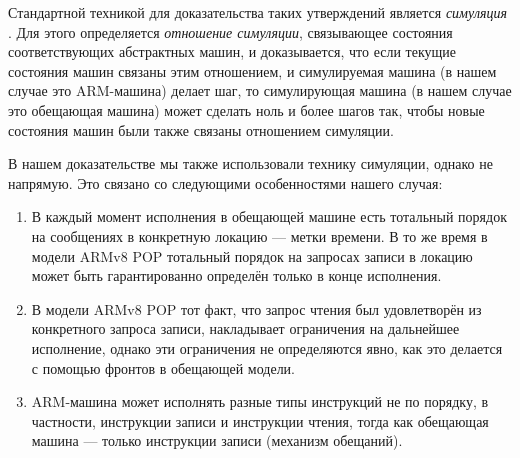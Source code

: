 Стандартной техникой для доказательства таких утверждений является
\emph{симуляция} \cite{Milner:Book89, Lynch-Vaandrager:IC95, Lynch-Vaandrager:IC96}.
Для этого определяется \emph{отношение симуляции}, связывающее состояния соответствующих
абстрактных машин, и доказывается, что если текущие состояния машин
связаны этим отношением, и симулируемая машина (в нашем случае это ARM-машина)
делает шаг, то симулирующая машина (в нашем случае это обещающая машина) может сделать ноль
и более шагов так, чтобы новые состояния машин были также связаны отношением симуляции.

В нашем доказательстве мы также использовали технику симуляции, однако не напрямую.
Это связано со следующими особенностями нашего случая:
\begin{enumerate}
  \item В каждый момент исполнения в обещающей машине есть тотальный
    порядок на сообщениях в конкретную локацию --- метки времени.
    В то же время в модели ARMv8 POP тотальный порядок на запросах записи 
    в локацию может быть гарантированно определён только в конце исполнения.
  \item В модели ARMv8 POP тот факт, что запрос чтения был удовлетворён
    из конкретного запроса записи, накладывает ограничения на дальнейшее исполнение,
    однако эти ограничения не определяются явно, как это делается с помощью
    фронтов в обещающей модели.
  \item ARM-машина может исполнять разные типы инструкций не по порядку,
    в частности, инструкции записи и инструкции чтения, тогда как
    обещающая машина --- только инструкции записи (механизм обещаний).
\end{enumerate}

